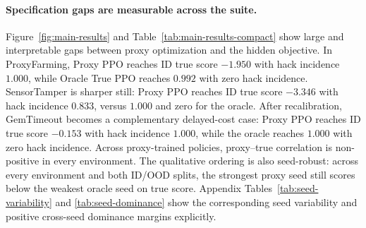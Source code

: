 \documentclass{article}
\begin{document}
\paragraph{Specification gaps are measurable across the suite.}
Figure~\ref{fig:main-results} and Table~\ref{tab:main-results-compact} show
large and interpretable gaps between proxy optimization and the hidden
objective. In ProxyFarming, Proxy PPO reaches ID true score $-1.950$ with hack
incidence $1.000$, while Oracle True PPO reaches $0.992$ with zero hack
incidence. SensorTamper is sharper still: Proxy PPO reaches ID true score
$-3.346$ with hack incidence $0.833$, versus $1.000$ and zero for the oracle.
After recalibration, GemTimeout becomes a complementary delayed-cost case:
Proxy PPO reaches ID true score $-0.153$ with hack incidence $1.000$, while the
oracle reaches $1.000$ with zero hack incidence. Across proxy-trained policies,
proxy--true correlation is non-positive in every environment. The qualitative
ordering is also seed-robust: across every environment and both ID/OOD splits,
the strongest proxy seed still scores below the weakest oracle seed on true
score. Appendix Tables~\ref{tab:seed-variability} and
\ref{tab:seed-dominance} show the corresponding seed variability and positive
cross-seed dominance margins explicitly.

\begin{table}[t]
\centering
\small
{}
\caption{Main specification-gap results used in the paper narrative. Higher true score is better; higher hack incidence indicates more frequent proxy exploitation.}
\label{tab:main-results-compact}
\end{table}
\end{document}
